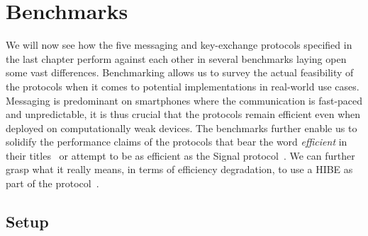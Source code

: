 \documentclass[11pt,a4paper,twoside,openright,bibliography=totoc]{scrbook}
\begin{document}
\chapter{Benchmarks}
\label{chap:benchmarks}

We will now see how the five messaging and key-exchange protocols
specified in the last chapter perform against each other in
several benchmarks laying open some vast differences.
Benchmarking allows us to survey the actual feasibility
of the protocols when it comes to potential implementations
in real-world use cases. Messaging is predominant
on smartphones where the communication is fast-paced
and unpredictable, it is thus crucial that the protocols
remain efficient even when deployed on computationally
weak devices. The benchmarks further enable us to
solidify the performance claims of the protocols
that bear the word \textit{efficient} in their
titles~\cite{durak2018bidirectional,jostefficient} or
attempt to be as efficient as the Signal protocol~\cite{alwen2018double}.
We can further grasp what it really means, in terms
of efficiency degradation, to use a HIBE as part
of the protocol~\cite{poettering2018towards,jaeger2018optimal}.

\section{Setup}
\label{sec:setup}
\end{document}
